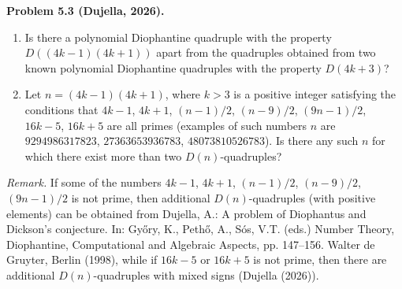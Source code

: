 \textbf{Problem 5.3 (Dujella, 2026).} \begin{enumerate}
\item Is there a polynomial Diophantine quadruple with the property $D((4k-1)(4k+1))$ apart from the quadruples obtained from two known polynomial Diophantine quadruples with the property $D(4k+3)$?
\item Let $n=(4k-1)(4k+1)$, where $k>3$ is a positive integer satisfying the conditions that $4k-1$, $4k+1$, $(n-1)/2$, $(n-9)/2$, $(9n-1)/2$, $16k-5$, $16k+5$ are all primes (examples of such numbers $n$ are $9294986317823$, $27363653936783$, $48073810526783$). Is there any such $n$ for which there exist more than two $D(n)$-quadruples?
\end{enumerate}

\medskip

\textit{Remark.} If some of the numbers $4k-1$, $4k+1$, $(n-1)/2$, $(n-9)/2$, $(9n-1)/2$ is not prime, then additional $D(n)$-quadruples (with positive elements) can be obtained from Dujella, A.: A problem of Diophantus and Dickson's conjecture. In: Győry, K., Pethő, A., Sós, V.T. (eds.) Number Theory, Diophantine, Computational and Algebraic Aspects, pp. 147--156. Walter de Gruyter, Berlin (1998), while if $16k-5$ or $16k+5$ is not prime, then there are additional $D(n)$-quadruples with mixed signs (Dujella (2026)).
